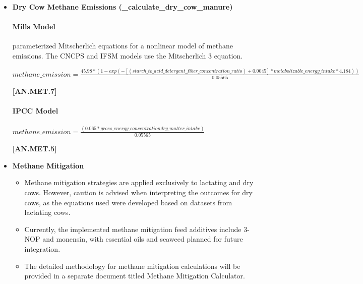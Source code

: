 \begin{refsection}
\begin{itemize}
            {\raggedleft \textbf{[AN.MET.5]}\par}
            \vspace{0.5cm}

        \item \textbf{Dry Cow Methane Emissions (\_calculate\_dry\_cow\_manure)}

\paragraph{Mills Model}
\vspace{-0.25cm}

\cite{Mills2003} parameterized Mitscherlich equations for a nonlinear model of methane emissions. The CNCPS and IFSM models use the Mitscherlich 3 equation.
\vspace{0.2cm}

    \begin{center}
        \(methane\_emission=\frac{45.98 * (1 - exp(-[(starch\_to\_acid\_detergent\_fiber\_concentration\_ratio) + 0.0045] *metabolizable\_energy\_intake * 4.184))}{0.05565}\)
    \end{center}
        \vspace{0.5cm} 
    
            {\raggedleft \textbf{[AN.MET.7]}\par}
            \vspace{0.5cm}

\paragraph{IPCC Model}\nocite{Niu2018}
\vspace{-0.25cm}

    \begin{center}
        \(methane\_emission = \frac{(0.065 * gross\_energy\_concentration dry\_matter\_intake)}{0.05565}\)
    \end{center}
        \vspace{0.5cm} 
    
            {\raggedleft \textbf{[AN.MET.5]}\par}
            \vspace{0.5cm}

        \item \textbf{Methane Mitigation}
        \begin{itemize}
            \item Methane mitigation strategies are applied exclusively to lactating and dry cows. However, caution is advised when interpreting the outcomes for dry cows, as the equations used were developed based on datasets from lactating cows.
            \item Currently, the implemented methane mitigation feed additives include 3-NOP and monensin, with essential oils and seaweed planned for future integration.
            \item The detailed methodology for methane mitigation calculations will be provided in a separate document titled Methane Mitigation Calculator.
        \end{itemize}
    \end{itemize}


\end{refsection}

